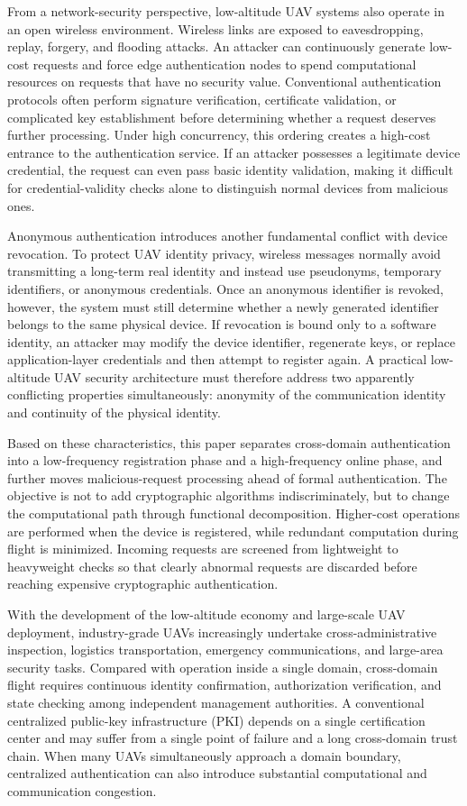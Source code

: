 \documentclass[lettersize,journal]{IEEEtran}
\begin{document}
	From a network-security perspective, low-altitude UAV systems also operate in an open wireless environment. Wireless links are exposed to eavesdropping, replay, forgery, and flooding attacks. An attacker can continuously generate low-cost requests and force edge authentication nodes to spend computational resources on requests that have no security value. Conventional authentication protocols often perform signature verification, certificate validation, or complicated key establishment before determining whether a request deserves further processing. Under high concurrency, this ordering creates a high-cost entrance to the authentication service. If an attacker possesses a legitimate device credential, the request can even pass basic identity validation, making it difficult for credential-validity checks alone to distinguish normal devices from malicious ones.
	
	Anonymous authentication introduces another fundamental conflict with device revocation. To protect UAV identity privacy, wireless messages normally avoid transmitting a long-term real identity and instead use pseudonyms, temporary identifiers, or anonymous credentials. Once an anonymous identifier is revoked, however, the system must still determine whether a newly generated identifier belongs to the same physical device. If revocation is bound only to a software identity, an attacker may modify the device identifier, regenerate keys, or replace application-layer credentials and then attempt to register again. A practical low-altitude UAV security architecture must therefore address two apparently conflicting properties simultaneously: anonymity of the communication identity and continuity of the physical identity.
	
	Based on these characteristics, this paper separates cross-domain authentication into a low-frequency registration phase and a high-frequency online phase, and further moves malicious-request processing ahead of formal authentication. The objective is not to add cryptographic algorithms indiscriminately, but to change the computational path through functional decomposition. Higher-cost operations are performed when the device is registered, while redundant computation during flight is minimized. Incoming requests are screened from lightweight to heavyweight checks so that clearly abnormal requests are discarded before reaching expensive cryptographic authentication.
	
	With the development of the low-altitude economy and large-scale UAV deployment, industry-grade UAVs increasingly undertake cross-administrative inspection, logistics transportation, emergency communications, and large-area security tasks. Compared with operation inside a single domain, cross-domain flight requires continuous identity confirmation, authorization verification, and state checking among independent management authorities. A conventional centralized public-key infrastructure (PKI) depends on a single certification center and may suffer from a single point of failure and a long cross-domain trust chain. When many UAVs simultaneously approach a domain boundary, centralized authentication can also introduce substantial computational and communication congestion.
	
\end{document}
